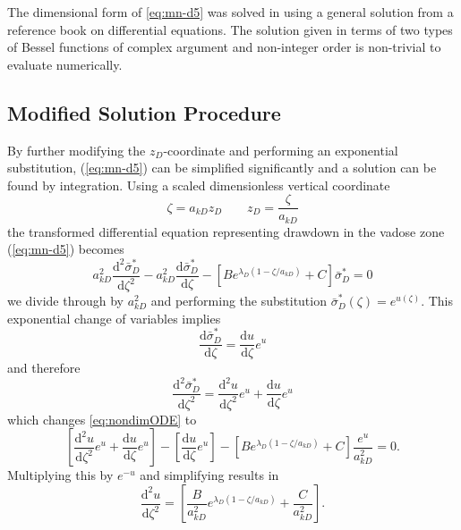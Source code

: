 \documentclass[12pt,letterpaper]{article}
\begin{document}
The dimensional form of \eqref{eq:mn-d5} was solved in \cite{mishra10} using a general solution from a
reference book on differential equations.  The solution given in terms
of two types of Bessel functions of complex argument and non-integer
order is non-trivial to evaluate numerically. 

\subsection{Modified Solution Procedure} 
By further modifying the $z_D$-coordinate and performing an exponential substitution, (\ref{eq:mn-d5}) can be simplified significantly and a solution can be found by integration.  Using a scaled dimensionless vertical coordinate 
\begin{equation}\nonumber
 \zeta= a_{kD} z_D \qquad z_D=\frac{\zeta}{a_{kD}} 
\end{equation}
the transformed differential equation representing drawdown in the vadose zone (\ref{eq:mn-d5}) becomes
\begin{equation}
  \label{eq:nondimODE}
  a_{kD}^2 \frac{\mathrm{d}^2
    \bar{\sigma}_D^{\ast}}{\mathrm{d}\zeta^2} - a_{kD}^2
  \frac{\mathrm{d} \bar{\sigma}_D^{\ast}}{\mathrm{d}\zeta} - \left[
    B e^{\lambda_D (1-\zeta/a_{kD})} + C\right] \bar{\sigma}_D^{\ast}=0
\end{equation}
we divide through by $a_{kD}^2$ and performing the substitution
$\bar{\sigma}_D^{\ast}(\zeta)=e^{u(\zeta)}$.  This exponential change of variables implies
\begin{equation}\nonumber
\frac{\mathrm{d}\bar{\sigma}_D^{\ast}}{\mathrm{d}\zeta} =
\frac{\mathrm{d}u}{\mathrm{d}\zeta}e^u
\end{equation} 
and therefore
\begin{equation}\nonumber
\frac{\mathrm{d}^2\bar{\sigma}_D^{\ast}}{\mathrm{d}\zeta^2} =
\frac{\mathrm{d}^2u}{\mathrm{d}\zeta^2}e^u +
\frac{\mathrm{d}u}{\mathrm{d}\zeta}e^u
\end{equation}
which changes \eqref{eq:nondimODE} to
\begin{equation}\nonumber
 \left[ \frac{\mathrm{d}^2u}{\mathrm{d}\zeta^2}e^u +
  \frac{\mathrm{d}u}{\mathrm{d}\zeta}e^u \right]-  \left[
  \frac{\mathrm{d}u}{\mathrm{d}\zeta}e^u \right]- \left[ B e^{\lambda_D (1-\zeta/a_{kD})} + C\right] \frac{e^{u}}{a_{kD}^2} =0.
\end{equation}
Multiplying this by $e^{-u}$ and simplifying results in
\begin{equation}
  \label{eq:expsubODE}
   \frac{\mathrm{d}^2 u}{\mathrm{d}\zeta^2} = \left[ \frac{B}{a_{kD}^2} e^{\lambda_D (1-\zeta/a_{kD})} + \frac{C}{a_{kD}^2}\right].
\end{equation}
\end{document}

